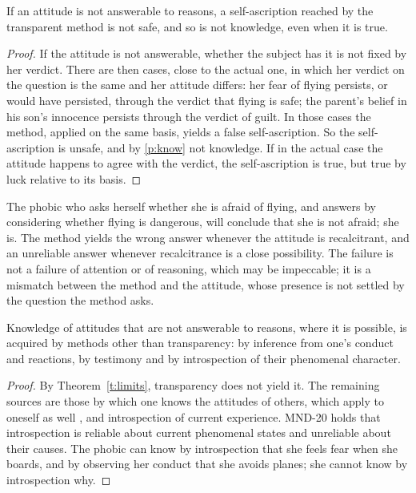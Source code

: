 \documentclass{situationist-preprint}
\begin{document}
\begin{theorem}[Limits]\label{t:limits}
If an attitude is not answerable to reasons, a self-ascription reached by the transparent method is not safe, and so is not knowledge, even when it is true.
\end{theorem}

\begin{proof}
If the attitude is not answerable, whether the subject has it is not fixed by her verdict. There are then cases, close to the actual one, in which her verdict on the question is the same and her attitude differs: her fear of flying persists, or would have persisted, through the verdict that flying is safe; the parent's belief in his son's innocence persists through the verdict of guilt. In those cases the method, applied on the same basis, yields a false self-ascription. So the self-ascription is unsafe, and by \ref{p:know} not knowledge. If in the actual case the attitude happens to agree with the verdict, the self-ascription is true, but true by luck relative to its basis.
\end{proof}

The phobic who asks herself whether she is afraid of flying, and answers by considering whether flying is dangerous, will conclude that she is not afraid; she is. The method yields the wrong answer whenever the attitude is recalcitrant, and an unreliable answer whenever recalcitrance is a close possibility. The failure is not a failure of attention or of reasoning, which may be impeccable; it is a mismatch between the method and the attitude, whose presence is not settled by the question the method asks.

\begin{corollary}\label{c:other}
Knowledge of attitudes that are not answerable to reasons, where it is possible, is acquired by methods other than transparency: by inference from one's conduct and reactions, by testimony and by introspection of their phenomenal character.
\end{corollary}

\begin{proof}
By Theorem~\ref{t:limits}, transparency does not yield it. The remaining sources are those by which one knows the attitudes of others, which apply to oneself as well \citep{Cassam2014}, and introspection of current experience. MND-20 holds that introspection is reliable about current phenomenal states and unreliable about their causes. The phobic can know by introspection that she feels fear when she boards, and by observing her conduct that she avoids planes; she cannot know by introspection why.
\end{proof}
\end{document}
